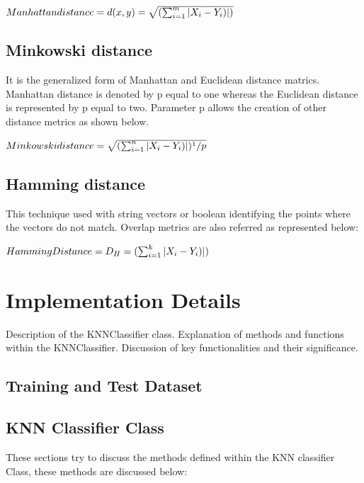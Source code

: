 \documentclass[conference]{IEEEtran}
\begin{document}
\begin{math}
\newline
 Manhattan distance = d(x,y)=\sqrt{(\sum_{i=1}^{m} |X_{i} - Y_{i})|)}
\end{math}

\subsection{Minkowski distance}
It is the generalized form of Manhattan and Euclidean distance matrics. Manhattan distance is denoted by p equal to one whereas the Euclidean distance is represented by p equal to two. Parameter p allows the creation of other distance metrics as shown below.

\begin{math}
\newline
 Minkowski distance =\sqrt{(\sum_{i=1}^{n} |X_{i} - Y_{i})|)^1/p}
\end{math}


\subsection{Hamming distance}
This technique used with string vectors or boolean identifying the points where the vectors do not match. Overlap metrics are also referred as represented below:

\begin{math}
\newline
 Hamming Distance = D_{H}=(\sum_{i=1}^{k} |X_{i} - Y_{i})|)
\end{math}



\section{Implementation Details}

Description of the KNNClassifier class.
Explanation of methods and functions within the KNNClassifier.
Discussion of key functionalities and their significance.

\subsection{Training and Test Dataset}









\subsection{KNN Classifier Class}
These sections try to discuss the methods defined within the KNN classifier Class, these methods are discussed below:
\end{document}
